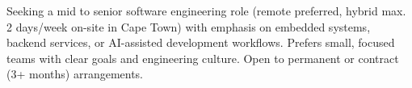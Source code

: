 
\begin{cvparagraph}
  Seeking a mid to senior software engineering role (remote preferred, hybrid max. 2 days/week on-site in Cape Town) with emphasis on embedded systems, backend services, or AI-assisted development workflows. Prefers small, focused teams with clear goals and engineering culture. Open to permanent or contract (3+ months) arrangements.
\end{cvparagraph}
